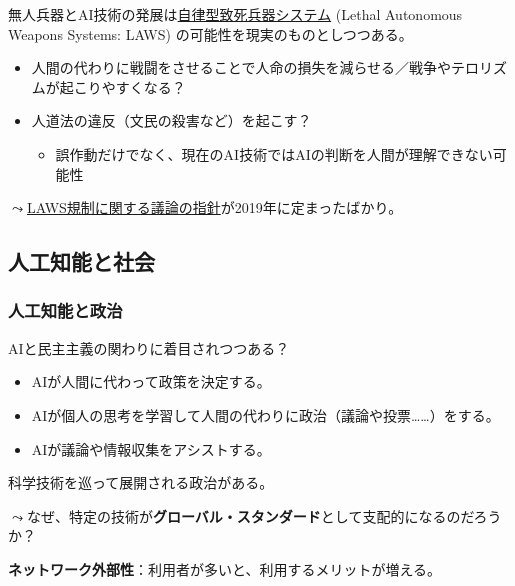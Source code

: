 \documentclass[
  xelatex,
  ja=standard]{bxjsarticle}
\providecommand{\tightlist}{%
  \setlength{\itemsep}{0pt}\setlength{\parskip}{0pt}}\usepackage{longtable,booktabs,array}
\begin{document}
無人兵器とAI技術の発展は\href{https://www.mofa.go.jp/mofaj/dns/ca/page24_001191.html}{自律型致死兵器システム}
(Lethal Autonomous Weapons Systems: LAWS)
の可能性を現実のものとしつつある。

\begin{itemize}
\tightlist
\item
  人間の代わりに戦闘をさせることで人命の損失を減らせる／戦争やテロリズムが起こりやすくなる？
\item
  人道法の違反（文民の殺害など）を起こす？

  \begin{itemize}
  \tightlist
  \item
    誤作動だけでなく、現在のAI技術ではAIの判断を人間が理解できない可能性
  \end{itemize}
\end{itemize}

\(\leadsto\)\href{https://jsil.jp/archives/expert/2020-10}{LAWS規制に関する議論の指針}が2019年に定まったばかり。

\hypertarget{ux4ebaux5de5ux77e5ux80fdux3068ux793eux4f1a}{%
\subsection{人工知能と社会}\label{ux4ebaux5de5ux77e5ux80fdux3068ux793eux4f1a}}

\hypertarget{ux4ebaux5de5ux77e5ux80fdux3068ux653fux6cbb}{%
\subsubsection{人工知能と政治}\label{ux4ebaux5de5ux77e5ux80fdux3068ux653fux6cbb}}

AIと民主主義の関わりに着目されつつある？

\begin{itemize}
\tightlist
\item
  AIが人間に代わって政策を決定する。
\item
  AIが個人の思考を学習して人間の代わりに政治（議論や投票\ldots\ldots）をする。
\item
  AIが議論や情報収集をアシストする。
\end{itemize}

科学技術を巡って展開される政治がある。

\(\leadsto\)なぜ、特定の技術が\textbf{グローバル・スタンダード}として支配的になるのだろうか？

\textbf{ネットワーク外部性}：利用者が多いと、利用するメリットが増える。
\end{document}
